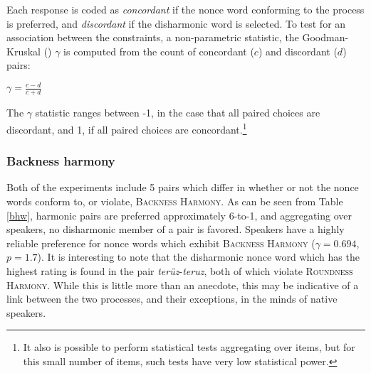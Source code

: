 Each response is coded as \emph{concordant} if the nonce word conforming to the process is preferred, and \emph{discordant} if the disharmonic word is selected. To test for an association between the constraints, a non-parametric statistic, the Goodman-Kruskal (\citeyear{Goodman1954}) $\gamma$ is computed from the count of concordant ($c$) and discordant ($d$) pairs:

\begin{unlabeledexample}
$\displaystyle \gamma = \frac{c - d}{c + d}$
\end{unlabeledexample}

\noindent
The $\gamma$ statistic ranges between -1, in the case that all paired choices are discordant, and 1, if all paired choices are concordant.\footnote{It also is possible to perform statistical tests aggregating over items, but for this small number of items, such tests have very low statistical power.}

\subsubsection{Backness harmony}

Both of the \citet{Zimmer1969} experiments include 5 pairs which differ in whether or not the nonce words conform to, or violate, \textsc{Backness Harmony}. As can be seen from Table \ref{bhw}, harmonic pairs are preferred approximately 6-to-1, and aggregating over speakers, no disharmonic member of a pair is favored. Speakers have a highly reliable preference for nonce words which exhibit \textsc{Backness Harmony} ($\gamma = 0.694$, $p = 1.7$). It is interesting to note that the disharmonic nonce word which has the highest rating is found in the pair \emph{terüz}-\emph{teruz}, both of which violate \textsc{Roundness Harmony}. While this is little more than an anecdote, this may be  indicative of a link between the two processes, and their exceptions, in the minds of native speakers. 

